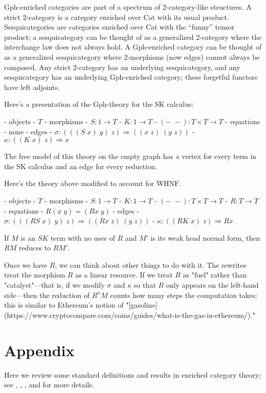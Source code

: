 \documentclass[a4paper,UKenglish]{article}
\begin{document}
Gph-enriched categories are part of a spectrum of 2-category-like structures.  A strict 2-category is a category enriched over Cat with its usual product.  Sesquicategories are categories enriched over Cat with the ``funny'' tensor product; a sesquicategory can be thought of as a generalized 2-category where the interchange law does not always hold.  A Gph-enriched category can be thought of as a generalized sesquicategory where 2-morphisms (now edges) cannot always be composed.  Any strict 2-category has an underlying sesquicategory, and any sesquicategory has an underlying Gph-enriched category; these forgetful functors have left adjoints.



Here's a presentation of the Gph-theory for the SK calculus:

- objects
  - $T$
- morphisms
  - $S\colon 1 \to T$
  - $K\colon 1 \to T$
  - $(-\; -)\colon T \times T \to T$
- equations
  - none
- edges
  - $\sigma\colon (((S\; x)\; y)\; z) \Rightarrow ((x\; z)\; (y\; z))$
  - $\kappa\colon ((K\; x)\; z) \Rightarrow x$

The free model of this theory on the empty graph has a vertex for every term in the SK calculus and an edge for every reduction.


Here's the theory above modified to account for WHNF.

- objects
  - $T$
- morphisms
  - $S\colon 1 \to T$
  - $K\colon 1 \to T$
  - $(-\; -)\colon T \times T \to T$
  - $R\colon T \to T$
- equations
  - $R(x\; y) = (Rx\; y)$
- edges
  - $\sigma\colon (((RS\; x)\; y)\; z) \Rightarrow ((Rx\; z)\; (y\; z))$
  - $\kappa\colon ((RK\; x)\; z) \Rightarrow Rx$

If $M$ is an $SK$ term with no uses of $R$ and $M'$ is its weak head normal form, then $RM$ reduces to $RM'.$

Once we have $R$, we can think about other things to do with it.  The rewrites treat the morphism $R$ as a linear resource.  If we treat $R$ as "fuel" rather than "catalyst"---that is, if we modify $\sigma$ and $\kappa$ so that $R$ only appears on the left-hand side---then the
reduction of $R^nM$ counts how many steps the computation takes; this is similar to Ethereum's notion of "[gasoline](https://www.cryptocompare.com/coins/guides/what-is-the-gas-in-ethereum/)."

\section{Appendix}
Here we review some standard definitions and results in enriched category theory; see \cite{CIS-335497}, \cite{Power99EnrichedLawvereTheories}, \cite{DBLP:journals/acs/LackR11}, and \cite{Trimble} for more details.
\end{document}
